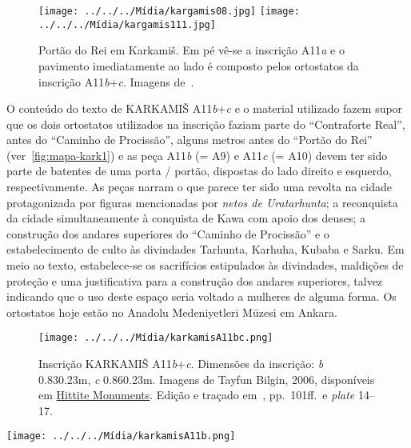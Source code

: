 \begin{figure}[h!]
	\begin{center}
		\texttt{[image: ../../../Mídia/kargamis08.jpg]}
		\texttt{[image: ../../../Mídia/kargamis111.jpg]}
	\end{center}
	\caption[``Portão do Rei'' em Karkamiš]{Portão do Rei em Karkamiš. Em pé
		vê-se a inscrição A11\emph{a} e o pavimento imediatamente ao lado é
		composto pelos ortostatos da inscrição A11\emph{b}+\emph{c}. Imagens
		de~\cite[\emph{plates} 46--7]{CarchemishIII}.}\label{fig:portao-real}
\end{figure}
\clearpage


O conteúdo do texto de KARKAMIŠ A11\emph{b}+\emph{c} e o material utilizado
fazem supor que os dois ortostatos utilizados na inscrição faziam parte do
``Contraforte Real'', antes do ``Caminho de Procissão'', alguns metros antes do
``Portão do Rei'' (ver~\autoref{fig:mapa-kark1}) e
as peça A11\emph{b} (= A9) e A11\emph{c} (= A10) devem ter sido parte de batentes
de uma porta \slash{} portão, dispostas do lado direito e esquerdo,
respectivamente.
As peças narram o que parece ter sido uma revolta na cidade protagonizada por
figuras mencionadas por \emph{netos de Uratarhunta}; a reconquista da cidade
simultaneamente à conquista de Kawa com apoio dos deuses; a construção dos
andares superiores do ``Caminho de Procissão'' e o estabelecimento de culto às
divindades Tarhunta, Karhuha, Kubaba e Sarku.
Em meio ao texto, estabelece-se os sacrifícios estipulados às divindades,
maldições de proteção e uma justificativa para a construção dos andares
superiores, talvez indicando que o uso deste espaço seria voltado a mulheres de
alguma forma.
Os ortostatos hoje estão no Anadolu Medeniyetleri Müzesi em Ankara.

\begin{figure}[h]
	\centering
	\texttt{[image: ../../../Mídia/karkamisA11bc.png]}

	\caption[KARKAMIŠ A11\emph{b}+\emph{c}]{Inscrição KARKAMIŠ A11\emph{b}+\emph{c}.
		Dimensões da inscrição:
		\emph{b} 0.83\times0.23m,
		\emph{c} 0.86\times0.23m.
		Imagens de Tayfun Bilgin, 2006,
		disponíveis em
		\href{https://www.hittitemonuments.com/karkamis/kargamis43.htm}{Hittite Monuments}.
		Edição e traçado em~, pp.\ 101ff.\ e \emph{plate}
		14--17.
	}%
\end{figure}
\clearpage

\begin{center}
	\texttt{[image: ../../../Mídia/karkamisA11b.png]}
\end{center}

